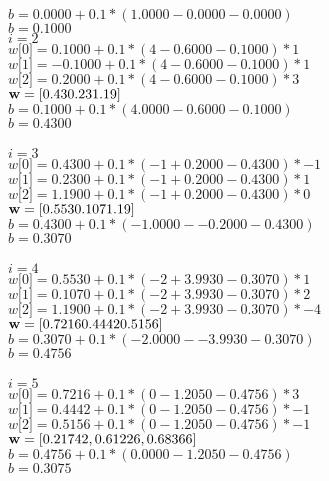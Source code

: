 \documentclass[12pt, fullpage,letterpaper]{article}
\begin{document}
\begin{enumerate}
$b = 0.0000 + 0.1*(1.0000 - 0.0000 - 0.0000)$\\
$b = 0.1000$\\

$i = 2$\\
$w\big[0\big] = 0.1000 + 0.1*(4 - 0.6000 - 0.1000)*1$\\
$w\big[1\big] = -0.1000 + 0.1*(4 - 0.6000 - 0.1000)*1$\\
$w\big[2\big] = 0.2000 + 0.1*(4 - 0.6000 - 0.1000)*3$\\
${\bf w} = [ 0.43  0.23  1.19]$\\

$b = 0.1000 + 0.1*(4.0000 - 0.6000 - 0.1000)$\\
$b = 0.4300$\\\\

$i = 3$\\
$w\big[0\big] = 0.4300 + 0.1*(-1 + 0.2000 - 0.4300)*-1$\\
$w\big[1\big] = 0.2300 + 0.1*(-1 + 0.2000 - 0.4300)*1$\\
$w\big[2\big] = 1.1900 + 0.1*(-1 + 0.2000 - 0.4300)*0$\\
${\bf w} = [ 0.553  0.107  1.19 ]$\\

$b = 0.4300 + 0.1*(-1.0000 - -0.2000 - 0.4300)$\\
$b = 0.3070$\\\\

$i = 4$\\
$w\big[0\big] = 0.5530 + 0.1*(-2 + 3.9930 - 0.3070)*1$\\
$w\big[1\big] = 0.1070 + 0.1*(-2 + 3.9930 - 0.3070)*2$\\
$w\big[2\big] = 1.1900 + 0.1*(-2 + 3.9930 - 0.3070)*-4$\\
${\bf w} = [ 0.7216  0.4442  0.5156]$\\

$b = 0.3070 + 0.1*(-2.0000 - -3.9930 - 0.3070)$\\
$b = 0.4756$\\\\

$i = 5$\\
$w\big[0\big] = 0.7216 + 0.1*(0 - 1.2050 - 0.4756)*3$\\
$w\big[1\big] = 0.4442 + 0.1*(0 - 1.2050 - 0.4756)*-1$\\
$w\big[2\big] = 0.5156 + 0.1*(0 - 1.2050 - 0.4756)*-1$\\
${\bf w} = [ 0.21742,  0.61226,  0.68366]$\\

$b = 0.4756 + 0.1*(0.0000 - 1.2050 - 0.4756)$\\
$b = 0.3075$\\

\end{enumerate}
\end{document}
